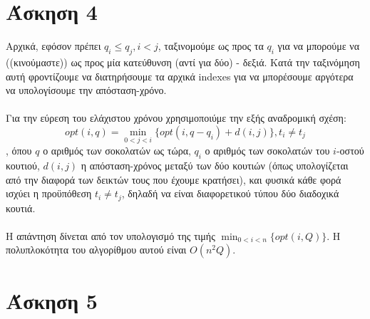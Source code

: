 \documentclass[12pt,a4paper]{article}
\begin{document}
  \section{Άσκηση 4}

    Αρχικά, εφόσον πρέπει \( q_i \le q_j, i < j \), ταξινομούμε ως προς τα \(
    q_i \) για να μπορούμε να ((κινούμαστε)) ως προς μία κατεύθυνση (αντί για
    δύο) - δεξιά. Κατά την ταξινόμηση αυτή φροντίζουμε να διατηρήσουμε τα
    αρχικά {\latintext indexes} για να μπορέσουμε αργότερα να υπολογίσουμε 
    την απόσταση-χρόνο.\\
    \\
    Για την εύρεση του ελάχιστου χρόνου χρησιμοποιύμε την εξής αναδρομική σχέση:
    \[ opt(i, q) = \min_{0 < j < i}\{ opt(i, q - q_i) + d(i, j) \}, t_i \neq t_j 
    \]
    , όπου \( q \) ο αριθμός των σοκολατών ως τώρα, \( q_i \) ο αριθμός των 
    σοκολατών του \( i \)-οστού κουτιού, \( d(i, j) \) η απόσταση-χρόνος μεταξύ
    των δύο κουτιών (όπως υπολογίζεται από την διαφορά των δεικτών τους που
    έχουμε κρατήσει), και φυσικά  κάθε φορά ισχύει η προϋπόθεση \(t_i \neq
    t_j \), δηλαδή να είναι διαφορετικού τύπου δύο διαδοχικά κουτιά. \\
    \\
    Η απάντηση δίνεται από τον υπολογισμό της τιμής \( \min_{0 < i < n}\{ opt(
    i, Q) \} \). Η πολυπλοκότητα του αλγορίθμου αυτού είναι \( O(n^2Q) \).
  
  \section{Άσκηση 5}
\end{document}
